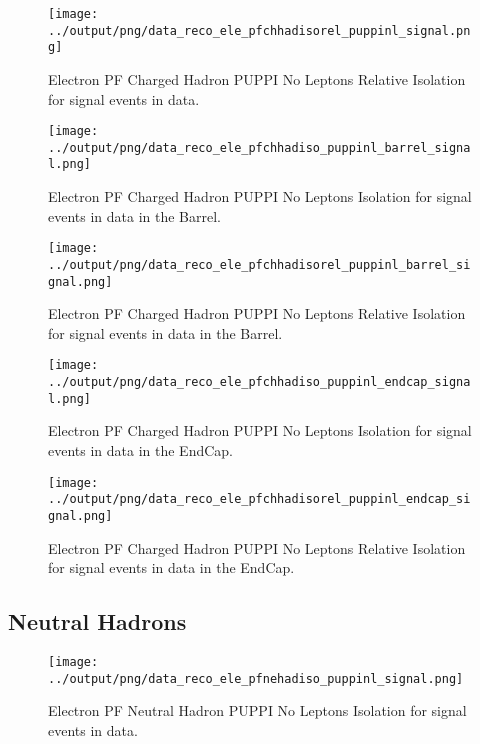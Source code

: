 \documentclass[11pt]{book}
\begin{document}
\begin{figure}[htb]
\centering
\texttt{[image: ../output/png/data\_reco\_ele\_pfchhadisorel\_puppinl\_signal.png]}
\caption{Electron PF Charged Hadron PUPPI No Leptons Relative Isolation for signal events in data.}
\label{fig:data_ele_pfchhadisorel_puppinl_signal}
\end{figure}

\begin{figure}[htb]
\centering
\texttt{[image: ../output/png/data\_reco\_ele\_pfchhadiso\_puppinl\_barrel\_signal.png]}
\caption{Electron PF Charged Hadron PUPPI No Leptons Isolation for signal events in data in the Barrel.}
\label{fig:data_ele_pfchhadiso_puppinl_barrel_signal}
\end{figure}

\begin{figure}[htb]
\centering
\texttt{[image: ../output/png/data\_reco\_ele\_pfchhadisorel\_puppinl\_barrel\_signal.png]}
\caption{Electron PF Charged Hadron PUPPI No Leptons Relative Isolation for signal events in data in the Barrel.}
\label{fig:data_ele_pfchhadisorel_puppinl_barrel_signal}
\end{figure}

\begin{figure}[htb]
\centering
\texttt{[image: ../output/png/data\_reco\_ele\_pfchhadiso\_puppinl\_endcap\_signal.png]}
\caption{Electron PF Charged Hadron PUPPI No Leptons Isolation for signal events in data in the EndCap.}
\label{fig:data_ele_pfchhadiso_puppinl_endcap_signal}
\end{figure}

\begin{figure}[htb]
\centering
\texttt{[image: ../output/png/data\_reco\_ele\_pfchhadisorel\_puppinl\_endcap\_signal.png]}
\caption{Electron PF Charged Hadron PUPPI No Leptons Relative Isolation for signal events in data in the EndCap.}
\label{fig:data_ele_pfchhadisorel_puppinl_endcap_signal}
\end{figure}
\clearpage

\subsection{Neutral Hadrons}
\begin{figure}[htb]
\centering
\texttt{[image: ../output/png/data\_reco\_ele\_pfnehadiso\_puppinl\_signal.png]}
\caption{Electron PF Neutral Hadron PUPPI No Leptons Isolation for signal events in data.}
\label{fig:data_ele_pfnehadiso_puppinl_signal}
\end{figure}
\end{document}
